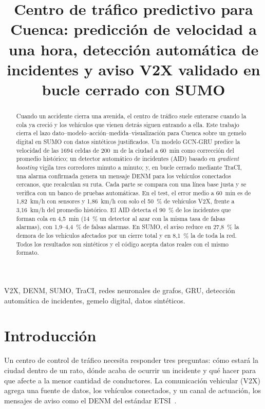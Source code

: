 \documentclass[conference,a4paper]{IEEEtran}
\begin{document}
\title{Centro de tráfico predictivo para Cuenca: predicción de velocidad a una hora, detección automática de incidentes y aviso V2X validado en bucle cerrado con SUMO}

\author{
}

\maketitle

\begin{abstract}
Cuando un accidente cierra una avenida, el centro de tráfico suele enterarse cuando la cola ya creció y los vehículos que vienen detrás siguen entrando a ella. Este trabajo cierra el lazo dato--modelo--acción--medida--visualización para Cuenca sobre un gemelo digital en SUMO con datos sintéticos justificados. Un modelo GCN-GRU predice la velocidad de las 1694 celdas de 200~m de la ciudad a 60~min como corrección del promedio histórico; un detector automático de incidentes (AID) basado en \emph{gradient boosting} vigila tres corredores minuto a minuto; y, en bucle cerrado mediante TraCI, una alarma confirmada genera un mensaje DENM para los vehículos conectados cercanos, que recalculan su ruta. Cada parte se compara con una línea base justa y se verifica con un banco de \PruebasTotal{} pruebas automáticas. En el test, el error medio a 60~min es de 1,82~km/h con sensores y 1,86~km/h con solo el 50~\% de vehículos V2X, frente a 3,16~km/h del promedio histórico. El AID detecta el 90~\% de los incidentes que forman cola en 4,5~min (14~\% un detector al azar con la misma tasa de falsas alarmas), con 1,9--4,4~\% de falsas alarmas. En SUMO, el aviso reduce en 27,8~\% la demora de los vehículos afectados por un cierre total y en 8,1~\% la de toda la red. Todos los resultados son sintéticos y el código acepta datos reales con el mismo formato.
\end{abstract}

\begin{IEEEkeywords}
V2X, DENM, SUMO, TraCI, redes neuronales de grafos, GRU, detección automática de incidentes, gemelo digital, datos sintéticos.
\end{IEEEkeywords}

\section{Introducción}
Un centro de control de tráfico necesita responder tres preguntas: cómo estará la ciudad dentro de un rato, dónde acaba de ocurrir un incidente y qué hacer para que afecte a la menor cantidad de conductores. La comunicación vehicular (V2X) agrega una fuente de datos, los vehículos conectados, y un canal de actuación, los mensajes de aviso como el DENM del estándar ETSI~\cite{etsi_denm}.
\end{document}
